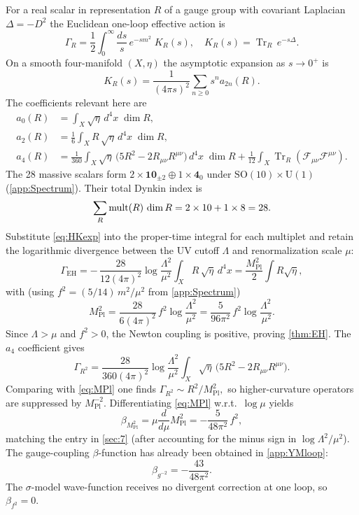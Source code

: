\documentclass[pdflatex,sn-mathphys-num]{sn-jnl}
\theoremstyle{thmstyleone}
\theoremstyle{thmstyletwo}%
\theoremstyle{thmstylethree}%
\newcommand{\SO}[1]{\mathrm{SO(#1)}}
\newcommand{\U}[1]{\mathrm{U(#1)}}
\newcommand{\SOTen}{\SO{10}}
\newcommand{\UOne}{\U{1}}
\newcommand{\Tr}{\operatorname{Tr}}
\begin{document}
\begin{appendices}
For a real scalar in representation \(R\) of a gauge group with
covariant Laplacian \(\Delta=-D^{2}\) the Euclidean one-loop effective
action is
\[
  \Gamma_{R}
  = \frac12\int_{0}^{\infty}\frac{ds}{s}\,e^{-sm^{2}}
    \;K_{R}(s),\quad
  K_{R}(s)=\Tr_{R}\,e^{-s\Delta}.
\]
On a smooth four-manifold $(X,\eta)$ the asymptotic expansion as
\(s\to0^{+}\) is
\begin{equation}\label{eq:HKexp}
  K_{R}(s)
  =\frac{1}{(4\pi s)^{2}}
   \sum_{n\ge0}s^{n}a_{2n}(R).
\end{equation}
The coefficients relevant here are
\begin{subequations}\label{eq:Coeffs}
\begin{align}
  a_{0}(R) &= \int_{X}\sqrt{\eta}\,d^{4}x\;\dim R,\\
  a_{2}(R) &= \frac16\int_{X}R\,\sqrt{\eta}\,d^{4}x\;\dim R,\\
  a_{4}(R) &= \frac{1}{360}\int_{X}\sqrt{\eta}\,
             \bigl(5R^{2}-2R_{\mu\nu}R^{\mu\nu}\bigr)\,d^{4}x\;\dim R
             +\frac{1}{12}
             \int_{X}\Tr_{R}(\mathcal F_{\mu\nu}\mathcal F^{\mu\nu}).
\end{align}
\end{subequations}
The 28 massive scalars form
\(
  2\times\mathbf{10}_{\pm2}
  \oplus
  1\times\mathbf{4}_{0}
\)
under \(\SOTen\times \UOne\) (\autoref{app:Spectrum}). Their total Dynkin index is
\[
    \sum_{R}{\rm mult}(R)\,\dim R = 2\times10+1\times8=28.
\]
Substitute \eqref{eq:HKexp} into the proper-time integral for each
multiplet and retain the logarithmic divergence between the UV cutoff
\(\Lambda\) and renormalization scale \(\mu\):
\[
  \Gamma_{\text{EH}}
  = -\,\frac{28}{12(4\pi)^{2}}
      \log\frac{\Lambda^{2}}{\mu^{2}}
      \int_{X}R\,\sqrt{\eta}\,d^{4}x
  = \frac{M_{\text{Pl}}^{2}}{2}\int R\sqrt{\eta},
\]
with (using \(f^{2}=(5/14)\,m^{2}/\mu^{2}\) from \autoref{app:Spectrum})
\begin{equation}
  M_{\text{Pl}}^{2}
  = \frac{28}{6(4\pi)^{2}}\,f^{2}
    \log\frac{\Lambda^{2}}{\mu^{2}}
  =\frac{5}{96\pi^{2}}\,
     f^{2}\log\frac{\Lambda^{2}}{\,\mu^{2}}.
\label{eq:MPl}
\end{equation}
Since \(\Lambda>\mu\) and \(f^{2}>0\), the Newton coupling is positive,
proving \autoref{thm:EH}.
The \(a_{4}\) coefficient gives
\[
  \Gamma_{R^{2}}
  = \frac{28}{360(4\pi)^{2}}
    \log\frac{\Lambda^{2}}{\mu^{2}}
    \int_{X}\sqrt{\eta}\,
      \bigl(5R^{2}-2R_{\mu\nu}R^{\mu\nu}\bigr).
\]
Comparing with \eqref{eq:MPl} one finds
\(
  \Gamma_{R^{2}}\sim R^{2}/M_{\text{Pl}}^{2},
\)
so higher-curvature operators are suppressed by
\(M_{\text{Pl}}^{-2}\).
Differentiating \eqref{eq:MPl} w.r.t.\ \(\log\mu\) yields
\[
  \beta_{M_{\text{Pl}}^{2}}
  =\mu\frac{d}{d\mu}M_{\text{Pl}}^{2}
  = -\frac{5}{48\pi^{2}}\,f^{2},
\]
matching the entry in \autoref{sec:7} (after accounting for the
minus sign in \(\log\Lambda^{2}/\mu^{2}\)). The gauge-coupling $\beta$-function
has already been obtained in \autoref{app:YMloop}:
\[
  \beta_{g^{-2}}=-\frac{43}{48\pi^{2}}.
\]
The $\sigma$-model wave-function receives no divergent correction at one loop,
so \(\beta_{f^{2}}=0\).


\end{appendices}
\end{document}
